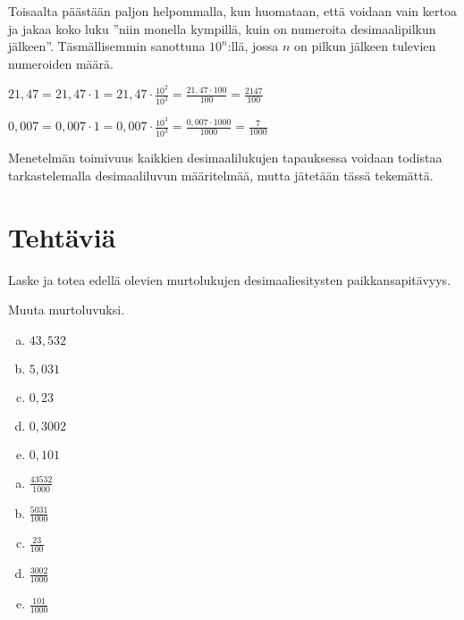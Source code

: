 Toisaalta päästään paljon helpommalla, kun huomataan, että voidaan vain kertoa ja jakaa koko luku ''niin monella kympillä, kuin on numeroita desimaalipilkun jälkeen''. Täsmällisemmin sanottuna $10^n$:llä, jossa $n$ on pilkun jälkeen tulevien numeroiden määrä.

\begin{esimerkki}
$21,47 = 21,47 \cdot 1 = 21,47 \cdot \frac{10^2}{10^2} = \frac{21,47 \cdot 100}{100} = \frac{2147}{100}$
\end{esimerkki}

\begin{esimerkki}
$0,007 = 0,007 \cdot 1 = 0,007 \cdot \frac{10^3}{10^3} = \frac{0,007 \cdot 1000}{1000} = \frac{7}{1000}$
\end{esimerkki}

Menetelmän toimivuus kaikkien desimaalilukujen tapauksessa voidaan todistaa tarkastelemalla desimaaliluvun määritelmää, mutta jätetään tässä tekemättä.


\section*{Tehtäviä}

\begin{tehtava}
Laske ja totea edellä olevien murtolukujen desimaaliesitysten paikkansapitävyys.
\end{tehtava}

\begin{tehtava}
Muuta murtoluvuksi.
	\begin{enumerate}[a)]
		\item $43{,}532$
		\item $5{,}031$
		\item $0{,}23$
		\item $0{,}3002$
		\item $0{,}101$
	\end{enumerate}
\begin{vastaus}
	\begin{enumerate}[a)]
		\item $ \frac{43532}{1000}$
		\item $ \frac{5031}{1000}$
		\item $ \frac{23}{100}$
		\item $ \frac{3002}{1000}$
		\item $ \frac{101}{1000}$
	\end{enumerate}
\end{vastaus}
\end{tehtava}


